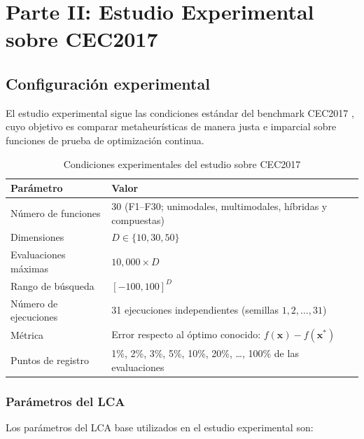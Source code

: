 
\newpage
\section{Parte II: Estudio Experimental sobre CEC2017}
\label{sec:parte2}

\subsection{Configuración experimental}

El estudio experimental sigue las condiciones estándar del benchmark CEC2017
\cite{wu2016cec2017}, cuyo objetivo es comparar metaheurísticas de manera justa
e imparcial sobre funciones de prueba de optimización continua.

\begin{table}[h!]
\centering
\caption{Condiciones experimentales del estudio sobre CEC2017}
\label{tab:config}
\renewcommand{\arraystretch}{1.3}
\small
\begin{tabular}{@{}ll@{}}
\toprule
\textbf{Parámetro} & \textbf{Valor} \\
\midrule
Número de funciones & 30 (F1--F30; unimodales, multimodales, híbridas y compuestas) \\
Dimensiones & $D \in \{10, 30, 50\}$ \\
Evaluaciones máximas & $10{,}000 \times D$ \\
Rango de búsqueda & $[-100, 100]^D$ \\
Número de ejecuciones & 31 ejecuciones independientes (semillas $1,2,\ldots,31$) \\
Métrica & Error respecto al óptimo conocido: $f(\mathbf{x}) - f(\mathbf{x}^*)$ \\
Puntos de registro & 1\%, 2\%, 3\%, 5\%, 10\%, 20\%, \ldots, 100\% de las evaluaciones \\
\bottomrule
\end{tabular}
\end{table}

\subsubsection{Parámetros del LCA}

Los parámetros del LCA base utilizados en el estudio experimental son:

